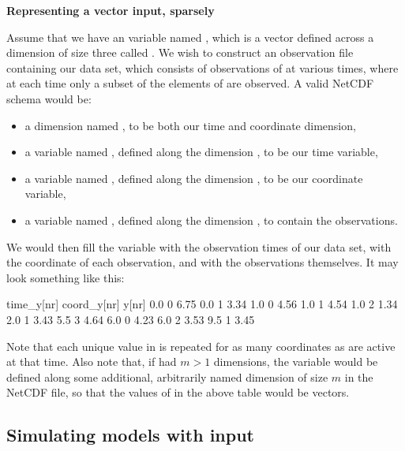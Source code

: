 \begin{example}
\noindent \textbf{Representing a vector input, sparsely}

Assume that we have an  variable named , which is a vector
defined across a dimension of size three called . We wish to construct
an observation file containing our data set, which consists of observations of
 at various times, where at each time only a subset of the elements of
 are observed. A valid NetCDF schema would be:
\begin{itemize}
\item a dimension named , to be both our time and coordinate
  dimension,
\item a variable named , defined along the dimension ,
  to be our time variable,
\item a variable named , defined along the dimension ,
  to be our coordinate variable,
\item a variable named , defined along the dimension , to
  contain the observations.
\end{itemize}
We would then fill the variable  with the observation times of
our data set,  with the coordinate of each observation, and
 with the observations themselves. It may look something like this:

\begin{cmdcode}
time_y[nr]   coord_y[nr]      y[nr]
       0.0             0       6.75
       0.0             1       3.34
       1.0             0       4.56
       1.0             1       4.54
       1.0             2       1.34
       2.0             1       3.43
       5.5             3       4.64
       6.0             0       4.23
       6.0             2       3.53
       9.5             1       3.45
\end{cmdcode}

Note that each unique value in  is repeated for as many
coordinates as are active at that time. Also note that, if  had $m >
1$ dimensions, the  variable would be defined along some
additional, arbitrarily named dimension of size $m$ in the NetCDF file, so
that the values of  in the above table would be vectors.
\end{example}

\subsection{Simulating models with input\label{Simulating_models_with_input}}


